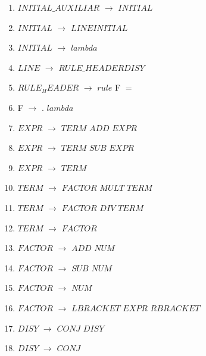 \begin{enumerate}
\item $INITIAL\_AUXILIAR$ $\rightarrow$ $INITIAL$ \\
\item $INITIAL$   $\rightarrow$  $LINE INITIAL$ \\
\item $INITIAL$   $\rightarrow$  $lambda$ \\
\item $LINE$   $\rightarrow$  $RULE\_HEADER DISY$ \\
\item $RULE_HEADER$ 	$\rightarrow$	$rule$ F $=\ $ \\
\item F	 $\rightarrow$	. \textbar  $lambda$ \\

\item $EXPR$ $\rightarrow$ $TERM$ $ADD$ $EXPR$ \\
\item $EXPR$ $\rightarrow$ $TERM$ $SUB$ $EXPR$ \\
\item $EXPR$ $\rightarrow$ $TERM$ \\

\item $TERM$ $\rightarrow$ $FACTOR$ $MULT$ $TERM$\\
\item $TERM$ $\rightarrow$ $FACTOR$ $DIV$ $TERM$\\
\item $TERM$ $\rightarrow$ $FACTOR$\\

\item $FACTOR$ $\rightarrow$ $ADD$ $NUM$ \\
\item $FACTOR$ $\rightarrow$ $SUB$ $NUM$ \\
\item $FACTOR$ $\rightarrow$ $NUM$ \\
\item $FACTOR$ $\rightarrow$ $LBRACKET$ $EXPR$ $RBRACKET$\\


\item $DISY$   	$\rightarrow$  $CONJ$ \textbar $DISY$ \\
\item $DISY$   	$\rightarrow$  $CONJ$ \\


\end{enumerate}
